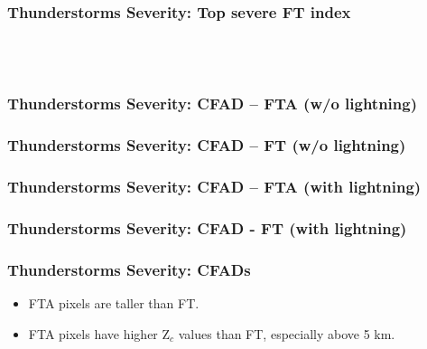 \documentclass[smaller]{beamer}
\begin{document}


\begin{frame}
\frametitle{Thunderstorms Severity: Top severe FT index}
~~
\\
\\

\end{frame}

  
\begin{frame}
\frametitle{Thunderstorms Severity: CFAD -- FTA (w/o lightning)}

\end{frame}

\begin{frame}
\frametitle{Thunderstorms Severity: CFAD -- FT (w/o lightning)}

\end{frame}

\begin{frame}
\frametitle{Thunderstorms Severity: CFAD -- FTA (with lightning) }

\end{frame}

\begin{frame}
\frametitle{Thunderstorms Severity: CFAD - FT (with lightning)}

\end{frame}


\begin{frame}
\frametitle{Thunderstorms Severity: CFADs}
\begin{itemize}
\item FTA pixels are taller than FT.
\item FTA pixels have higher Z$_c$ values than FT, especially above 5 km.
\end{itemize}
\end{frame}

\end{document}
